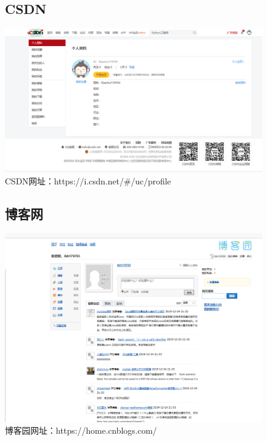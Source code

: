 \documentclass{article}
\begin{document}
\begin{itemize}
\begin{figure}[htb!]
\item\subsection{CSDN}
\centering
\includegraphics[scale=0.25]{CSDN}
\caption{CSDN网址：https://i.csdn.net/\#/uc/profile}
\label{fig:CSDN}
\end{figure}

\begin{figure}[htb!]
\item\subsection{博客网}
\centering
\includegraphics[scale=0.25]{bokeyuan}
\caption{博客园网址：https://home.cnblogs.com/}
\label{fig:bokeyuan}
\end{figure}


\end{itemize}
\end{document}

